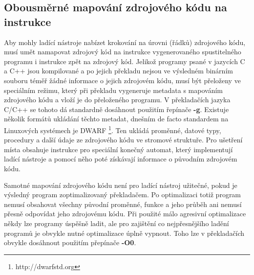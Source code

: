\documentclass[bc,male,python,dept460]{diploma}						%
\newcommand{\parspace}[1][]{
	\ifthenelse{\isempty{#1}}{\vspace{5mm}}{\vspace{#1}}
	\par
}
\begin{document}
	\subsection{Obousměrné mapování zdrojového kódu na instrukce}
		Aby mohly ladící nástroje nabízet krokování na úrovni (řádků) zdrojového kódu, musí umět namapovat zdrojový kód na instrukce vygenerovaného
		spustitelného programu i instrukce zpět na zdrojový kód. Jelikož programy psané v jazycích C a C++ jsou kompilované a po jejich překladu nejsou
		ve výsledném binárním souboru téměř žádné informace o jejich zdrojovém kódu, musí být přeloženy ve speciálním režimu, který při překladu vygeneruje
		metadata s mapováním zdrojového kódu a vloží je do přeloženého programu. V překladačích jazyka C/C++ se tohoto dá standardně dosáhnout použitím
		řepínače \textbf{-g}. Existuje několik formátů ukládání těchto metadat, dnešním de facto standardem na Linuxových systémech je DWARF
		\footnote{http://dwarfstd.org}. Ten ukládá proměnné, datové typy, procedury a další údaje ze zdrojového kódu ve stromové struktuře.
		Pro ušetření místa obsahuje instrukce pro speciální konečný automat, který implementují ladící nástroje a pomocí něho poté získávají
		informace o původním zdrojovém kódu.
		
		\parspace Samotné mapování zdrojového kódu není pro ladící nástroj užitečné, pokud je výsledný program zoptimalizovaný překladačem. Po optimalizaci
		totiž program nemusí obsahovat všechny původní proměnné, funkce a jeho průběh ani nemusí přesně odpovídat jeho zdrojovému kódu. Při použité málo agresivní
		optimalizace někdy lze programy úspěšně ladit, ale pro zajištění co nejpřesnějšího ladění programů je obvykle nutné optimalizace úplně vypnout. Toho lze
		v překladačích obvykle dosáhnout použitím přepínače \textbf{-O0}.
	
\end{document}
